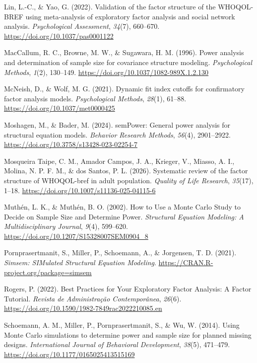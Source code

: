 \documentclass[
  letterpaper,
  DIV=11,
  numbers=noendperiod]{scrartcl}
\newlength{\cslhangindent}
\newenvironment{CSLReferences}[2] %
 {\begin{list}{}{%
  \setlength{\itemindent}{0pt}
  \setlength{\leftmargin}{0pt}
  \setlength{\parsep}{0pt}
  \ifodd #1
   \setlength{\leftmargin}{\cslhangindent}
   \setlength{\itemindent}{-1\cslhangindent}
  \fi
  \setlength{\itemsep}{#2\baselineskip}}}
 {\end{list}}
\begin{document}
\begin{CSLReferences}{1}{0}
Lin, L.-C., \& Yao, G. (2022). Validation of the factor structure of the
{WHOQOL-BREF} using meta-analysis of exploratory factor analysis and
social network analysis. \emph{Psychological Assessment}, \emph{34}(7),
660--670. \url{https://doi.org/10.1037/pas0001122}

MacCallum, R. C., Browne, M. W., \& Sugawara, H. M. (1996). Power
analysis and determination of sample size for covariance structure
modeling. \emph{Psychological Methods}, \emph{1}(2), 130--149.
\url{https://doi.org/10.1037/1082-989X.1.2.130}

McNeish, D., \& Wolf, M. G. (2021). Dynamic fit index cutoffs for
confirmatory factor analysis models. \emph{Psychological Methods},
\emph{28}(1), 61--88. \url{https://doi.org/10.1037/met0000425}

Moshagen, M., \& Bader, M. (2024). {semPower}: {General} power analysis
for structural equation models. \emph{Behavior Research Methods},
\emph{56}(4), 2901--2922.
\url{https://doi.org/10.3758/s13428-023-02254-7}

{Mosqueira Taipe, C. M., Amador Campos, J. A., Krieger, V., Miasso, A.
I., Molina, N. P. F. M., \& dos Santos, P. L.} (2026). Systematic review
of the factor structure of {WHOQOL-bref} in adult population.
\emph{Quality of Life Research}, \emph{35}(17), 1--18.
\url{https://doi.org/10.1007/s11136-025-04115-6}

Muthén, L. K., \& Muthén, B. O. (2002). How to {Use} a {Monte Carlo
Study} to {Decide} on {Sample Size} and {Determine Power}.
\emph{Structural Equation Modeling: A Multidisciplinary Journal},
\emph{9}(4), 599--620. \url{https://doi.org/10.1207/S15328007SEM0904_8}

Pornprasertmanit, S., Miller, P., Schoemann, A., \& Jorgensen, T. D.
(2021). \emph{Simsem: {SIMulated Structural Equation Modeling}}.
\url{https://CRAN.R-project.org/package=simsem}

Rogers, P. (2022). Best {Practices} for {Your Exploratory Factor
Analysis}: {A Factor Tutorial}. \emph{Revista de Administração
Contemporânea}, \emph{26}(6).
\url{https://doi.org/10.1590/1982-7849rac2022210085.en}

Schoemann, A. M., Miller, P., Pornprasertmanit, S., \& Wu, W. (2014).
Using {Monte Carlo} simulations to determine power and sample size for
planned missing designs. \emph{International Journal of Behavioral
Development}, \emph{38}(5), 471--479.
\url{https://doi.org/10.1177/0165025413515169}


\end{CSLReferences}
\end{document}

